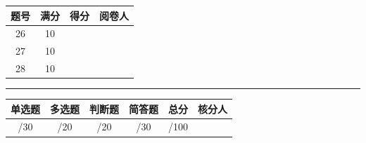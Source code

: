 \documentclass[11pt,a4paper]{article}
\begin{document}
\vspace{0.5em}
\begin{tabular}{|c|c|c|c|}
\hline
\textbf{题号} & \textbf{满分} & \textbf{得分} & \textbf{阅卷人} \\
\hline
26 & 10 & & \\
\hline
27 & 10 & & \\
\hline
28 & 10 & & \\
\hline
\end{tabular}

\vspace{2em}

\noindent\rule{\linewidth}{0.4pt}

\vspace{0.5em}
\begin{center}
\begin{tabular}{|c|c|c|c|c||c|}
\hline
\textbf{单选题} & \textbf{多选题} & \textbf{判断题} & \textbf{简答题} & \textbf{总分} & \textbf{核分人} \\
\hline
/30 & /20 & /20 & /30 & /100 & \\
\hline
\end{tabular}
\end{center}
\end{document}
